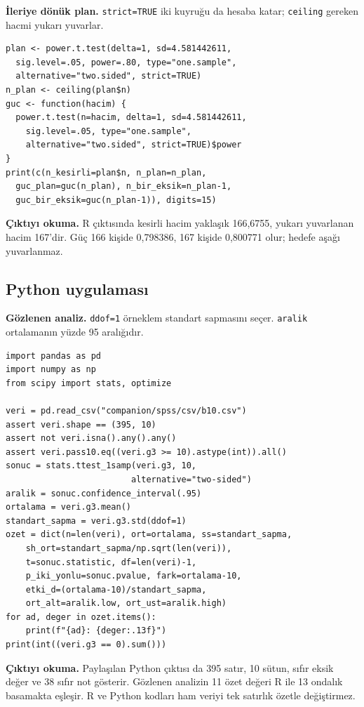 \par\noindent\begin{minipage}{\linewidth}
\textbf{İleriye dönük plan.} \texttt{strict=TRUE} iki kuyruğu da
hesaba katar; \texttt{ceiling} gereken hacmi yukarı yuvarlar.

\begin{lstlisting}[style=prismR]
plan <- power.t.test(delta=1, sd=4.581442611,
  sig.level=.05, power=.80, type="one.sample",
  alternative="two.sided", strict=TRUE)
n_plan <- ceiling(plan$n)
guc <- function(hacim) {
  power.t.test(n=hacim, delta=1, sd=4.581442611,
    sig.level=.05, type="one.sample",
    alternative="two.sided", strict=TRUE)$power
}
print(c(n_kesirli=plan$n, n_plan=n_plan,
  guc_plan=guc(n_plan), n_bir_eksik=n_plan-1,
  guc_bir_eksik=guc(n_plan-1)), digits=15)
\end{lstlisting}

\textbf{Çıktıyı okuma.} R çıktısında kesirli hacim yaklaşık
166,6755, yukarı yuvarlanan hacim 167'dir. Güç 166 kişide
0,798386, 167 kişide 0,800771 olur; hedefe aşağı yuvarlanmaz.
\end{minipage}\par

\par\noindent\begin{minipage}{\linewidth}
\subsection{Python uygulaması}
\label{sec:python-b10}

\textbf{Gözlenen analiz.} \texttt{ddof=1} örneklem standart
sapmasını seçer. \texttt{aralik} ortalamanın yüzde 95 aralığıdır.

\begin{lstlisting}[style=prismPythonApp]
import pandas as pd
import numpy as np
from scipy import stats, optimize

veri = pd.read_csv("companion/spss/csv/b10.csv")
assert veri.shape == (395, 10)
assert not veri.isna().any().any()
assert veri.pass10.eq((veri.g3 >= 10).astype(int)).all()
sonuc = stats.ttest_1samp(veri.g3, 10,
                         alternative="two-sided")
aralik = sonuc.confidence_interval(.95)
ortalama = veri.g3.mean()
standart_sapma = veri.g3.std(ddof=1)
ozet = dict(n=len(veri), ort=ortalama, ss=standart_sapma,
    sh_ort=standart_sapma/np.sqrt(len(veri)),
    t=sonuc.statistic, df=len(veri)-1,
    p_iki_yonlu=sonuc.pvalue, fark=ortalama-10,
    etki_d=(ortalama-10)/standart_sapma,
    ort_alt=aralik.low, ort_ust=aralik.high)
for ad, deger in ozet.items():
    print(f"{ad}: {deger:.13f}")
print(int((veri.g3 == 0).sum()))
\end{lstlisting}

\textbf{Çıktıyı okuma.} Paylaşılan Python çıktısı da 395 satır,
10 sütun, sıfır eksik değer ve 38 sıfır not gösterir. Gözlenen
analizin 11 özet değeri R ile 13 ondalık basamakta eşleşir.
R ve Python kodları ham veriyi tek satırlık özetle değiştirmez.
\end{minipage}\par

